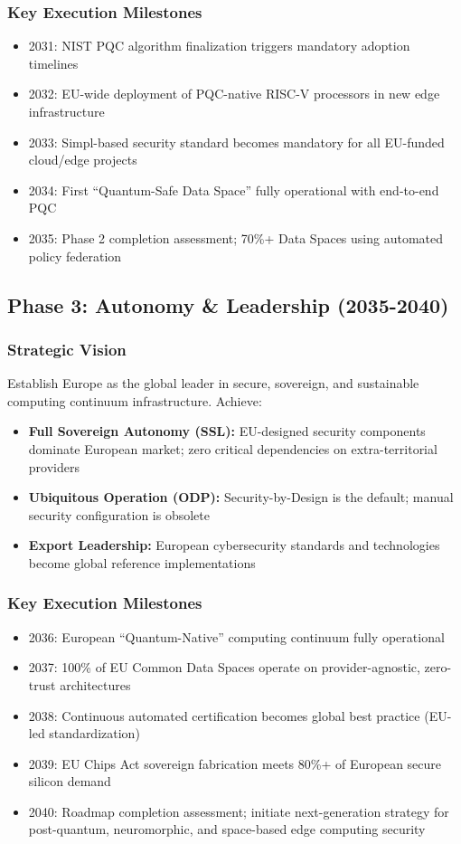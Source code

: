 \documentclass[12pt,a4paper]{article}
\begin{document}
\subsubsection*{Key Execution Milestones}
\begin{itemize}
    \item 2031: NIST PQC algorithm finalization triggers mandatory adoption timelines
    \item 2032: EU-wide deployment of PQC-native RISC-V processors in new edge infrastructure
    \item 2033: Simpl-based security standard becomes mandatory for all EU-funded cloud/edge projects
    \item 2034: First ``Quantum-Safe Data Space'' fully operational with end-to-end PQC
    \item 2035: Phase 2 completion assessment; 70\%+ Data Spaces using automated policy federation
\end{itemize}

\subsection*{Phase 3: Autonomy \& Leadership (2035-2040)}

\subsubsection*{Strategic Vision}
Establish Europe as the global leader in secure, sovereign, and sustainable computing continuum infrastructure. Achieve:
\begin{itemize}
    \item \textbf{Full Sovereign Autonomy (SSL):} EU-designed security components dominate European market; zero critical dependencies on extra-territorial providers
    \item \textbf{Ubiquitous Operation (ODP):} Security-by-Design is the default; manual security configuration is obsolete
    \item \textbf{Export Leadership:} European cybersecurity standards and technologies become global reference implementations
\end{itemize}

\subsubsection*{Key Execution Milestones}
\begin{itemize}
    \item 2036: European ``Quantum-Native'' computing continuum fully operational
    \item 2037: 100\% of EU Common Data Spaces operate on provider-agnostic, zero-trust architectures
    \item 2038: Continuous automated certification becomes global best practice (EU-led standardization)
    \item 2039: EU Chips Act sovereign fabrication meets 80\%+ of European secure silicon demand
    \item 2040: Roadmap completion assessment; initiate next-generation strategy for post-quantum, neuromorphic, and space-based edge computing security
\end{itemize}
\end{document}
